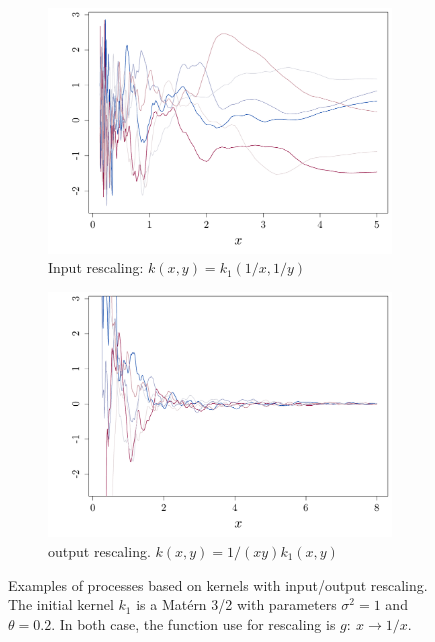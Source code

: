 \documentclass[twoside,openright]{report}
\begin{document}
\begin{figure}[ht!]
    \centering
    \begin{subfigure}[t]{0.45\textwidth}
            \includegraphics[width=\textwidth]{figures/ch5_rescKern1}
            \caption{Input rescaling: $k(x,y) = k_1(1/x,1/y)$ }
    \end{subfigure}%
    \hspace{1cm}       
    \begin{subfigure}[t]{0.45\textwidth}
            \includegraphics[width=\textwidth]{figures/ch5_rescKern2}
            \caption{output rescaling. $k(x,y) = 1/(xy) k_1(x,y)$  }
    \end{subfigure}
    \caption{Examples of processes based on kernels with input/output rescaling. The initial kernel  $k_1$ is a Mat\'ern 3/2 with parameters $\sigma^2=1$ and $\theta=0.2$. In both case, the function use for rescaling is $g:\ x \rightarrow 1/x$.}
    \label{fig:ch5rescaling}
\end{figure}
\end{document}
